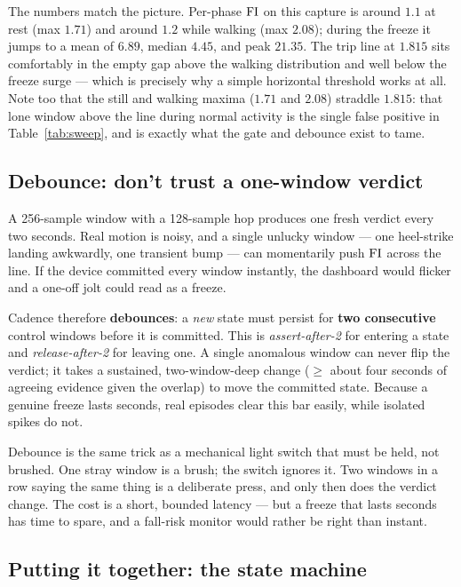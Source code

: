 The numbers match the picture. Per-phase $\mathrm{FI}$ on this capture is around $1.1$ at
rest (max $1.71$) and around $1.2$ while walking (max $2.08$); during the freeze it
jumps to a mean of $6.89$, median $4.45$, and peak $21.35$. The trip line at
$1.815$ sits comfortably in the empty gap above the walking distribution and well
below the freeze surge --- which is precisely why a simple horizontal threshold
works at all. Note too that the still and walking maxima ($1.71$ and $2.08$)
straddle $1.815$: that lone window above the line during normal activity is the
single false positive in Table~\ref{tab:sweep}, and is exactly what the gate and
debounce exist to tame.

\subsection{Debounce: don't trust a one-window verdict}

A 256-sample window with a 128-sample hop produces one fresh verdict every two
seconds. Real motion is noisy, and a single unlucky window --- one heel-strike
landing awkwardly, one transient bump --- can momentarily push $\mathrm{FI}$ across the
line. If the device committed every window instantly, the dashboard would flicker
and a one-off jolt could read as a freeze.

Cadence therefore \textbf{debounces}: a \emph{new} state must persist for
\textbf{two consecutive} control windows before it is committed. This is
\emph{assert-after-2} for entering a state and \emph{release-after-2} for leaving
one. A single anomalous window can never flip the verdict; it takes a sustained,
two-window-deep change ($\geq$ about four seconds of agreeing evidence given the
overlap) to move the committed state. Because a genuine freeze lasts seconds, real
episodes clear this bar easily, while isolated spikes do not.

\begin{intuition}
Debounce is the same trick as a mechanical light switch that must be held, not
brushed. One stray window is a brush; the switch ignores it. Two windows in a row
saying the same thing is a deliberate press, and only then does the verdict
change. The cost is a short, bounded latency --- but a freeze that lasts seconds
has time to spare, and a fall-risk monitor would rather be right than instant.
\end{intuition}

\subsection{Putting it together: the state machine}

